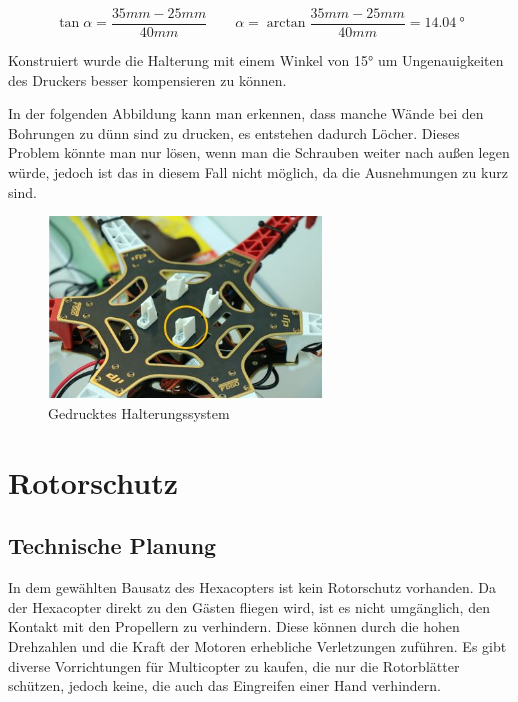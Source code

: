 			\[
 				\tan \alpha = \frac{35mm-25mm}{40mm}  \qquad \alpha = \arctan \frac{35mm-25mm}{40mm} = \SI{14.04}{\degree}
 			\]

	Konstruiert wurde die Halterung mit einem Winkel von 15° um Ungenauigkeiten des Druckers besser kompensieren zu können.

	In der folgenden Abbildung kann man erkennen, dass manche Wände bei den Bohrungen zu dünn sind zu drucken, es entstehen dadurch Löcher.
	Dieses Problem könnte man nur lösen, wenn man die Schrauben weiter nach außen legen würde, jedoch ist das in diesem Fall nicht möglich, da die Ausnehmungen zu kurz sind.


			\begin{figure}[tbh]
			\begin{centering}
			\includegraphics[width = 0.65\textwidth]{Bilder/halterung_cupcake_fertig_hinweis}
			\par\end{centering}
			\caption{Gedrucktes Halterungssystem}
			\label{halterung_cupcake_fertig_hinweis}
			\end{figure}

\section{Rotorschutz}

	\subsection{Technische Planung}

	In dem gewählten Bausatz des Hexacopters ist kein Rotorschutz vorhanden.
	Da der Hexacopter direkt zu den Gästen fliegen wird, ist es nicht umgänglich, den Kontakt mit den Propellern zu verhindern.
	Diese können durch die hohen Drehzahlen und die Kraft der Motoren erhebliche Verletzungen zuführen.
	Es gibt diverse Vorrichtungen für Multicopter zu kaufen, die nur die Rotorblätter schützen, jedoch keine, die auch das Eingreifen einer Hand verhindern.

